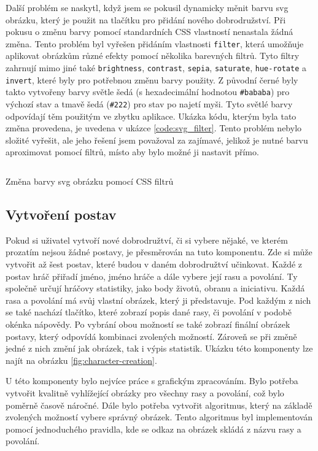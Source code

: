 Další problém se naskytl, když jsem se pokusil dynamicky měnit barvu svg obrázku, který je použit na tlačítku pro přidání nového dobrodružství. Při pokusu o změnu barvy pomocí standardních CSS vlastností nenastala žádná změna. Tento problém byl vyřešen přidáním vlastnosti \texttt{filter}, která umožňuje aplikovat obrázkům různé efekty pomocí několika barevných filtrů. Tyto filtry zahrnují mimo jiné také \texttt{brightness}, \texttt{contrast}, \texttt{sepia}, \texttt{saturate}, \texttt{hue-rotate} a \texttt{invert}, které byly pro potřebnou změnu barvy použity. Z původní černé byly takto vytvořeny barvy světle šedá (s hexadecimální hodnotou \texttt{\#bababa}) pro výchozí stav a tmavě šedá (\texttt{\#222}) pro stav po najetí myši. Tyto světlé barvy odpovídají těm použitým ve zbytku aplikace. Ukázka kódu, kterým byla tato změna provedena, je uvedena v ukázce \ref{code:svg_filter}. Tento problém nebylo složité vyřešit, ale jeho řešení jsem považoval za zajímavé, jelikož je nutné barvu aproximovat pomocí filtrů, místo aby bylo možné ji nastavit přímo.

\begin{listing}[H]
  \inputminted[breaklines]{css}{resources/code/svg_color.css}
  \caption{Změna barvy svg obrázku pomocí CSS filtrů}
  \label{code:svg_filter}
\end{listing}

\subsection{Vytvoření postav}
Pokud si uživatel vytvoří nové dobrodružtví, či si vybere nějaké, ve kterém prozatím nejsou žádné postavy, je přesměrován na tuto komponentu. Zde si může vytvořit až šest postav, které budou v daném dobrodružtví učinkovat. Každé z postav hráč přiřadí jméno, jméno hráče a dále vybere její rasu a povolání. Ty společně určují hráčovy statistiky, jako body životů, obranu a iniciativu. Každá rasa a povolání má svůj vlastní obrázek, který ji představuje. Pod každým z nich se také nachází tlačítko, které zobrazí popis dané rasy, či povolání v podobě okénka nápovědy. Po vybrání obou možností se také zobrazí finální obrázek postavy, který odpovídá kombinaci zvolených možností. Zároveň se při změně jedné z nich změní jak obrázek, tak i výpis statistik. Ukázku této komponenty lze najít na obrázku \ref{fig:character-creation}.

U této komponenty bylo nejvíce práce s grafickým zpracováním. Bylo potřeba vytvořit kvalitně vyhlížející obrázky pro všechny rasy a povolání, což bylo poměrně časově náročné. Dále bylo potřeba vytvořit algoritmus, který na základě zvolených možností vybere správný obrázek. Tento algoritmus byl implementován pomocí jednoduchého pravidla, kde se odkaz na obrázek skládá z názvu rasy a povolání.

